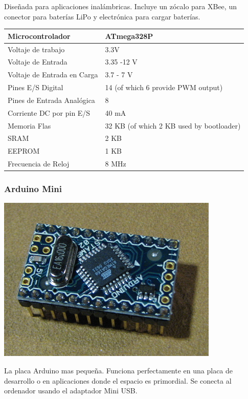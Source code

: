 \documentclass[12pt,a4paper]{report}
\begin{document}
Diseñada para aplicaciones inalámbricas. Incluye un zócalo para XBee, un
conector para baterías LiPo y electrónica para cargar baterías. 

\begin{tabular}{||l | l ||}
\hline
\hline
Microcontrolador & ATmega328P\\
\hline
Voltaje de trabajo & 3.3V\\
\hline
Voltaje de Entrada & 3.35 -12 V\\
\hline
Voltaje de Entrada en Carga & 3.7 - 7 V\\
\hline
Pines E/S Digital & 14 (of which 6 provide PWM output)\\
\hline
Pines de Entrada Analógica & 8\\
\hline
Corriente DC por pin E/S & 40 mA\\
\hline
Memoria Flas & 	32 KB (of which 2 KB used by bootloader)\\
\hline
SRAM & 2 KB\\
\hline
EEPROM & 1 KB\\
\hline
Frecuencia de Reloj & 8 MHz\\
\hline
\hline
\end{tabular}

\subsubsection{Arduino Mini}

\includegraphics[scale=0.6]{arduino_mini.jpg}

La placa Arduino mas pequeña. Funciona perfectamente en una placa de desarrollo
o en aplicaciones donde el espacio es primordial. Se conecta al ordenador usando
el adaptador Mini USB. 
\end{document}

